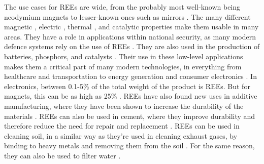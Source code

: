 The use cases for REEs are wide, from the probably most well-known being neodymium magnets \cite{USDoE2024} to lesser-known ones such as mirrors \cite{britannica2024}. The many different magnetic \cite{USDoE2024}, electric \cite{britannica2024}, thermal \cite{britannica2024}, and catalytic \cite{britannica2024} properties make them usable in many areas. They have a role in applications within national security, as many modern defence systems rely on the use of REEs \cite{USDoE2024}. They are also used in the production of batteries, phosphors, and catalysts \cite{USDoE2024}. Their use in these low-level applications makes them a critical part of many modern technologies, in everything from healthcare and transportation to energy generation and consumer electronics \cite{USDoE2024}. In electronics, between 0.1-5\% of the total weight of the product is REEs. But for magnets, this can be as high as 25\% \cite{britannica2024}. REEs have also found new uses in additive manufacturing, where they have been shown to increase the durability of the materials \cite{additive2022}. REEs can also be used in cement, where they improve durability and therefore reduce the need for repair and replacement \cite{cement2009}. REEs can be used in cleaning soil, in a similar way as they're used in cleaning exhaust gases, by binding to heavy metals and removing them from the soil \cite{soil2017b}. For the same reason, they can also be used to filter water \cite{water2024}.